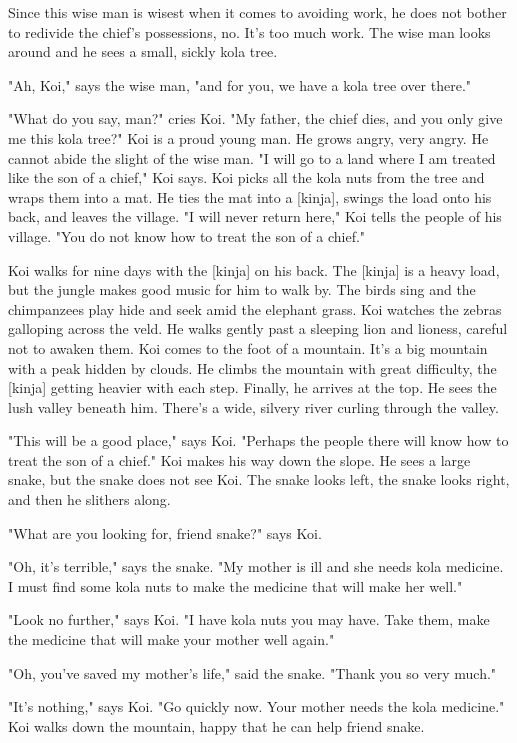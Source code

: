 Since this wise man is wisest when it comes to avoiding work, he does not bother to redivide the chief's possessions, no. It's too much work. The wise man looks around and he sees a small, sickly kola tree.

"Ah, Koi," says the wise man, "and for you, we have a kola tree over there."

"What do you say, man?" cries Koi. "My father, the chief dies, and you only give me this kola tree?" Koi is a proud young man. He grows angry, very angry. He cannot abide the slight of the wise man. "I will go to a land where I am treated like the son of a chief," Koi says. Koi picks all the kola nuts from the tree and wraps them into a mat. He ties the mat into a [kinja], swings the load onto his back, and leaves the village. "I will never return here," Koi tells the people of his village. "You do not know how to treat the son of a chief."

Koi walks for nine days with the [kinja] on his back. The [kinja] is a heavy load, but the jungle makes good music for him to walk by. The birds sing and the chimpanzees play hide and seek amid the elephant grass. Koi watches the zebras galloping across the veld. He walks gently past a sleeping lion and lioness, careful not to awaken them. Koi comes to the foot of a mountain. It's a big mountain with a peak hidden by clouds. He climbs the mountain with great difficulty, the [kinja] getting heavier with each step. Finally, he arrives at the top. He sees the lush valley beneath him. There's a wide, silvery river curling through the valley.

"This will be a good place," says Koi. "Perhaps the people there will know how to treat the son of a chief." Koi makes his way down the slope. He sees a large snake, but the snake does not see Koi. The snake looks left, the snake looks right, and then he slithers along.

"What are you looking for, friend snake?" says Koi.

"Oh, it's terrible," says the snake. "My mother is ill and she needs kola medicine. I must find some kola nuts to make the medicine that will make her well."

"Look no further," says Koi. "I have kola nuts you may have. Take them, make the medicine that will make your mother well again."

"Oh, you've saved my mother's life," said the snake. "Thank you so very much."

"It's nothing," says Koi. "Go quickly now. Your mother needs the kola medicine." Koi walks down the mountain, happy that he can help friend snake.

